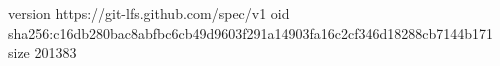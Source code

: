 version https://git-lfs.github.com/spec/v1
oid sha256:c16db280bac8abfbc6cb49d9603f291a14903fa16c2cf346d18288cb7144b171
size 201383
